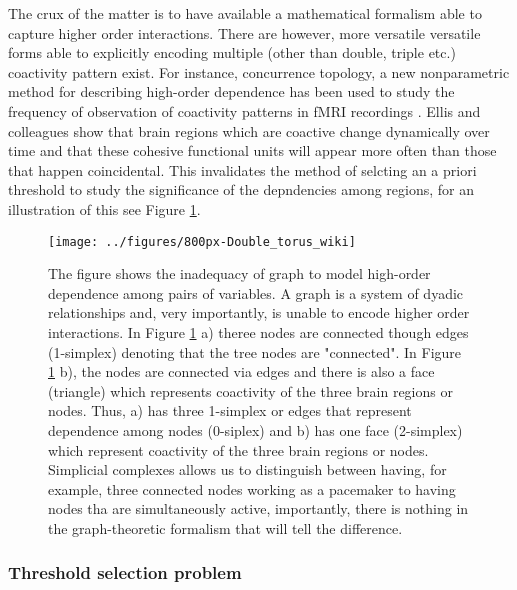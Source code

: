 \documentclass[onecollarge,runningheads]{svjour2}
\begin{document}
The crux of the matter is to have available a mathematical formalism able to capture higher order interactions. There are however, more versatile versatile forms able to explicitly encoding multiple (other than double, triple etc.) coactivity pattern exist. For instance, concurrence topology, a new nonparametric method for describing high-order dependence has been used to study the frequency of observation of coactivity patterns in fMRI recordings \cite{ellis2014describing}. Ellis and colleagues \cite{ellis2014describing} show that brain regions which are coactive change dynamically over time and that these cohesive functional units will appear more often than those that happen coincidental. This invalidates the method of selcting an a priori threshold to study the significance of the depndencies among regions, for an illustration of this see Figure \ref{ex:dyadic}.

\begin{figure}[h]
        \centering
        \texttt{[image: ../figures/800px-Double\_torus\_wiki]}
        \caption{The figure shows the inadequacy of graph to model high-order dependence among pairs of variables. A graph is a system of dyadic relationships and, very importantly, is unable to encode higher order interactions. In Figure \ref{ex:dyadic} a) theree nodes are connected though edges (1-simplex) denoting that the tree nodes are "connected". In Figure \ref{ex:dyadic} b), the nodes are connected via edges and there is also a face (triangle) which represents coactivity of the three brain regions or nodes. Thus, a) has three 1-simplex or edges that represent dependence among nodes (0-siplex) and b) has one face (2-simplex) which represent coactivity of the three brain regions or nodes. Simplicial complexes allows us to distinguish between having, for example, three connected nodes working as a pacemaker to having nodes tha are simultaneously active, importantly, there is nothing in the graph-theoretic formalism that will tell the difference.
         }
\label{ex:dyadic}
\end{figure}

\subsubsection{Threshold selection problem}
\label{sse:thr}
\end{document}
